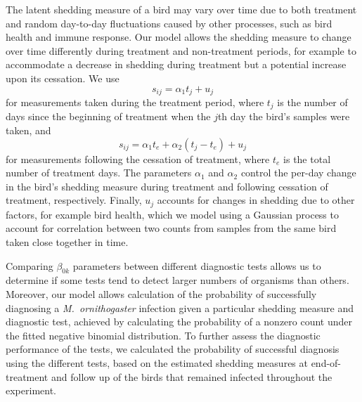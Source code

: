 \documentclass{article}
\begin{document}
The latent shedding measure of a bird may vary over time due to both
treatment and random day-to-day fluctuations caused by other
processes, such as bird health and immune response. Our model allows
the shedding measure to change over time differently during treatment
and non-treatment periods, for example to accommodate a decrease in
shedding during treatment but a potential increase upon its
cessation. We use
\begin{equation}
  s_{ij} = \alpha_1 t_j + u_j
\end{equation}
for measurements taken during the treatment period, where $t_j$ is
the number of days since the beginning of treatment when the $j$th day
the bird's samples were taken, and
\begin{equation}
  s_{ij} =  \alpha_1 t_e + \alpha_2 (t_j - t_e) + u_j
\end{equation}
for measurements following the cessation of treatment, where $t_e$ is
the total number of treatment days. The parameters $\alpha_1$ and
$\alpha_2$ control the per-day change in the bird's shedding measure
during treatment and following cessation of treatment,
respectively. Finally, $u_j$ accounts for changes in shedding due to
other factors, for example bird health, which we model using a
Gaussian process to account for correlation between two counts from
samples from the same bird taken close together in time.

Comparing $\beta_{0k}$ parameters between different diagnostic tests
allows us to determine if some tests tend to detect larger numbers of
organisms than others. Moreover, our model allows calculation of the
probability of successfully diagnosing a \emph{M.\ ornithogaster}
infection given a particular shedding measure and diagnostic test,
achieved by calculating the probability of a nonzero count under the
fitted negative binomial distribution. To further assess the
diagnostic performance of the tests, we calculated the probability of
successful diagnosis using the different tests, based on the estimated
shedding measures at end-of-treatment and follow up of the birds that
remained infected throughout the experiment.
\end{document}
